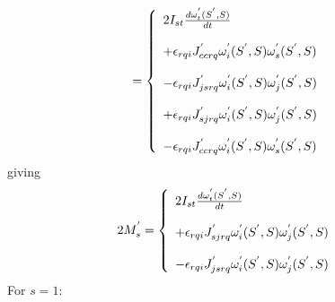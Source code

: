 \begin{align}
&=\left\{\begin{array}{l}
2I_{st}\dv{\omega^{'}_{t}(S^{'},S)}{t}\\\\ +\epsilon_{rqi}J^{'}_{ccrq}\omega^{'}_{i}(S^{'},S)\omega^{'}_{s}(S^{'},S) \\\\
-\epsilon_{rqi}J^{'}_{jsrq}\omega^{'}_{i}(S^{'},S)\omega^{'}_{j}(S^{'},S) \\\\+\epsilon_{rqi}J^{'}_{sjrq}\omega^{'}_{i}(S^{'},S)\omega^{'}_{j}(S^{'},S) 
\\\\-\epsilon_{rqi}J^{'}_{ccrq}\omega^{'}_{i}(S^{'},S)\omega^{'}_{s}(S^{'},S)
\end{array}\right.
\end{align}
giving
\begin{align}
2M^{'}_{s}&=\left\{\begin{array}{l}
2I_{st}\dv{\omega^{'}_{t}(S^{'},S)}{t} 
\\\\+\epsilon_{rqi}J^{'}_{sjrq}\omega^{'}_{i}(S^{'},S)\omega^{'}_{j}(S^{'},S)
\\\\
-\epsilon_{rqi}J^{'}_{jsrq}\omega^{'}_{i}(S^{'},S)\omega^{'}_{j}(S^{'},S)  
\end{array}\right.
\end{align}
For $s=1$:
